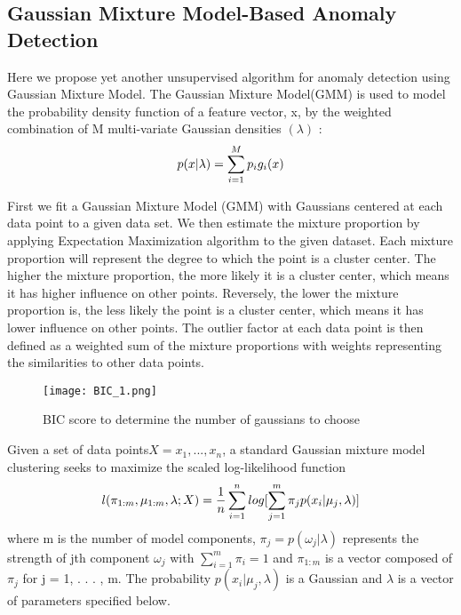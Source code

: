  \subsection*{Gaussian Mixture Model-Based Anomaly Detection}
Here we propose yet another unsupervised algorithm for anomaly detection using Gaussian Mixture Model. The Gaussian Mixture Model(GMM) is used to model the probability density function of a feature vector, x, by the weighted combination of M multi-variate Gaussian densities $(\lambda)$ \cite{marinai2007machine} :
\begin{equation}\label{eq:1}
  p(x|\lambda)= \sum_{i=1}^{M} {p_ig_i(x)}  \\
 \end{equation}

First we fit a Gaussian Mixture Model (GMM) with Gaussians centered at each data point to a given data set. We then estimate the mixture proportion by applying Expectation Maximization algorithm to the given dataset. Each mixture proportion will represent the degree to which the point is a cluster center. The higher the mixture proportion, the more likely it is a cluster center, which means it has higher influence on other points. Reversely, the lower the mixture proportion is, the less likely the point is a cluster center, which means it has lower influence on other points. The outlier factor at each data point is then defined as a weighted sum of the mixture proportions with weights representing the similarities to other data points.	

\begin{figure}[tph!]
\centerline{\texttt{[image: BIC\_1.png]}}
    \caption{BIC score to determine the number of gaussians to choose}
    \label{fig:verticalcell}
\end{figure}
\label{sec:Algorithm}

Given a set of data points$ X ={x_1, . . . , x_n} $, a standard Gaussian mixture model clustering seeks to maximize the scaled log-likelihood function \cite{perl2009outlier}\\
\begin{equation}\label{eq:2}
  l(\pi_{1:m}, \mu_{1:m}, \lambda; X)= \frac{1}{n}\sum_{i=1}^{n} {log[\sum_{j=1}^{m}{\pi_ jp(x_i|\mu_j,\lambda)}]}  \\
 \end{equation}
 where m is the number of model components, $\pi_j = p(\omega_j |\lambda)$ represents the strength of jth component $\omega_j$ with $\sum_{i=1}^{m}{\pi_i = 1}$ and $\pi_{1:m}$ is a vector composed of $\pi_j$ for j = 1, . . . , m. The probability $p(x_i|\mu_j , \lambda)$ is a Gaussian and $\lambda$ is a vector of parameters specified below.


